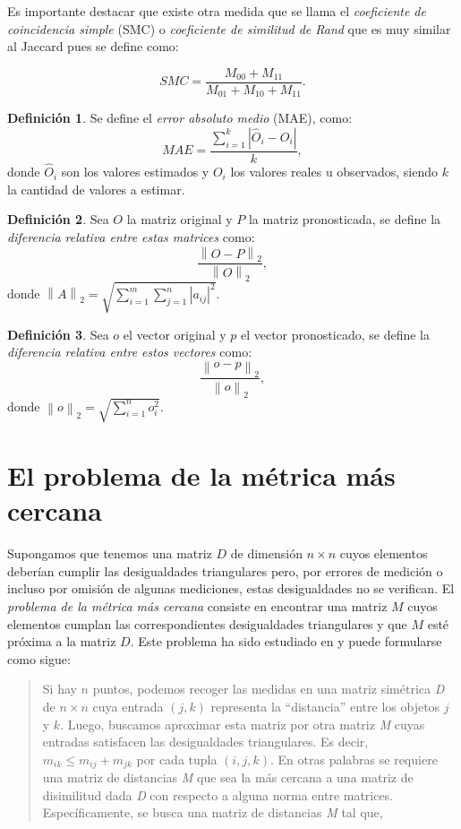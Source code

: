 \documentclass[12pt]{report} %
\theoremstyle{definition}
\newtheorem{definition}{Definición}[section]
\newcommand{\norm}[1]{\left\lVert#1\right\rVert}
\begin{document}
{Es importante destacar que existe otra medida que se llama el \textit{coeficiente de coincidencia simple} (SMC) \cite{smc} o\textit{ coeficiente de similitud de Rand} que es muy similar al Jaccard pues se define como:

$$ SMC =  \dfrac{M_{00} + M_{11}}{M_{01} + M_{10} + M_{11}} .$$

\begin{definition}\label{mae}
Se define el \textit{error absoluto medio} (MAE), como:
$$ MAE=\dfrac{\sum\limits_{i=1}^{k}\left| \widehat{O}_{i} - O_{i}\right|}{k}, $$
donde $\widehat{O}_{i}$ son los valores estimados y $O_{i}$ los valores reales u observados, siendo $k$ la cantidad de valores a estimar.\cite{Error}
\end{definition}

\begin{definition}
	Sea $O$ la matriz original y $P$ la matriz pronosticada, se define la \textit{diferencia relativa entre estas matrices} como:
	$$ \dfrac{\norm{O-P}_2}{\norm{O}_2},$$
	donde $\norm{A}_2 = \sqrt{\sum\limits_{i=1}^{m}\sum\limits_{j=1}^{n}\left| a_{ij}\right|^2 }$.	
\end{definition}

\begin{definition}
	Sea $o$ el vector original y $p$ el vector pronosticado, se define la \textit{diferencia relativa entre estos vectores} como:
	$$ \dfrac{\norm{o-p}_2}{\norm{o}_2},$$
	donde $\norm{o}_2 = \sqrt{\sum\limits_{i=1}^{n}o_i^2}$.
\end{definition}

\section{El problema de la métrica más cercana}

Supongamos que tenemos una matriz $D$ de dimensión $n \times n$ cuyos elementos deberían cumplir las desigualdades triangulares pero, por errores de medición o incluso por omisión de algunas mediciones, estas desigualdades no se verifican. El \textit{problema de la métrica más cercana} consiste en encontrar una matriz $M$ cuyos elementos cumplan las correspondientes desigualdades triangulares y que $M$ esté próxima a la matriz $D$. Este problema ha sido estudiado en \cite{MetricNearnessProblemApplications} \cite{MetricNearness}  y puede formularse como sigue:

\begin{quotation}
Si hay $n$ puntos, podemos recoger las medidas en una matriz simétrica  \textit{D} de $n \times n$ cuya entrada $(j,k)$
representa la ``distancia'' entre los objetos $j$ y $k$. Luego, buscamos aproximar esta matriz por otra matriz \textit{M} cuyas entradas satisfacen las desigualdades triangulares. Es decir, $m_{ik} \leq m_{ij} + m_{jk}$ por cada tupla $(i,j,k)$. En otras  palabras se requiere una matriz de distancias  \textit{M} que sea la más cercana a una matriz de disimilitud dada  \textit{D} con respecto a alguna norma entre matrices. Específicamente, se busca una matriz de distancias \textit{M} tal que,


\end{quotation}}
\end{document}
